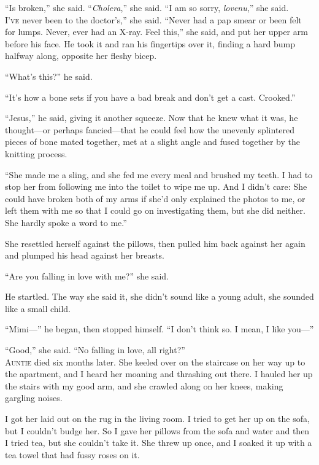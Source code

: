 ``Is broken,'' she said.  ``\textit{Cholera},'' she said.  ``I am so
sorry, \textit{lovenu},'' she said.
\\
\lettrine[lines=3, lhang=.5, nindent=0pt, findent=2pt]{I}{'ve}
never been to the doctor's,'' she said.  ``Never had a pap
smear or been felt for lumps.  Never, ever had an X-ray.  Feel this,''
she said, and put her upper arm before his face.  He took it and ran
his fingertips over it, finding a hard bump halfway along, opposite
her fleshy bicep.

``What's this?'' he said.

``It's how a bone sets if you have a bad break and don't get a cast. 
Crooked.''

``Jesus,'' he said, giving it another squeeze.  Now that he knew what
it was, he thought---or perhaps fancied---that he could feel how the
unevenly splintered pieces of bone mated together, met at a slight
angle and fused together by the knitting process.

``She made me a sling, and she fed me every meal and brushed my teeth. 
I had to stop her from following me into the toilet to wipe me up. 
And I didn't care:  She could have broken both of my arms if she'd
only explained the photos to me, or left them with me so that I could
go on investigating them, but she did neither.  She hardly spoke a
word to me.''

She resettled herself against the pillows, then pulled him back
against her again and plumped his head against her breasts.

``Are you falling in love with me?'' she said.

He startled.  The way she said it, she didn't sound like a young
adult, she sounded like a small child.

``Mimi---'' he began, then stopped himself.  ``I don't think so.  I
mean, I like you---''

``Good,'' she said.  ``No falling in love, all right?''
\\
\lettrine[lines=3, lhang=.5, nindent=0pt, findent=2pt]{A}{untie} died six months later.  She keeled over on the staircase on her
way up to the apartment, and I heard her moaning and thrashing out
there.  I hauled her up the stairs with my good arm, and she crawled
along on her knees, making gargling noises.

I got her laid out on the rug in the living room.  I tried to get her
up on the sofa, but I couldn't budge her.  So I gave her pillows from
the sofa and water and then I tried tea, but she couldn't take it. 
She threw up once, and I soaked it up with a tea towel that had fussy
roses on it.

